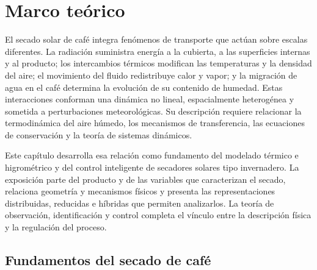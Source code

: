 
\providecommand{\rutafigurasfundamentos}{figuras_fundamentos}

\clearpage
\chapter{Marco teórico}
\label{ch:marco_teorico}

El secado solar de café integra fenómenos de transporte que actúan sobre escalas diferentes. La radiación suministra energía a la cubierta, a las superficies internas y al producto; los intercambios térmicos modifican las temperaturas y la densidad del aire; el movimiento del fluido redistribuye calor y vapor; y la migración de agua en el café determina la evolución de su contenido de humedad. Estas interacciones conforman una dinámica no lineal, espacialmente heterogénea y sometida a perturbaciones meteorológicas. Su descripción requiere relacionar la termodinámica del aire húmedo, los mecanismos de transferencia, las ecuaciones de conservación y la teoría de sistemas dinámicos.

Este capítulo desarrolla esa relación como fundamento del modelado térmico e higrométrico y del control inteligente de secadores solares tipo invernadero. La exposición parte del producto y de las variables que caracterizan el secado, relaciona geometría y mecanismos físicos y presenta las representaciones distribuidas, reducidas e híbridas que permiten analizarlos. La teoría de observación, identificación y control completa el vínculo entre la descripción física y la regulación del proceso.

\section{Fundamentos del secado de café}
\label{sec:fundamentos_secado}

